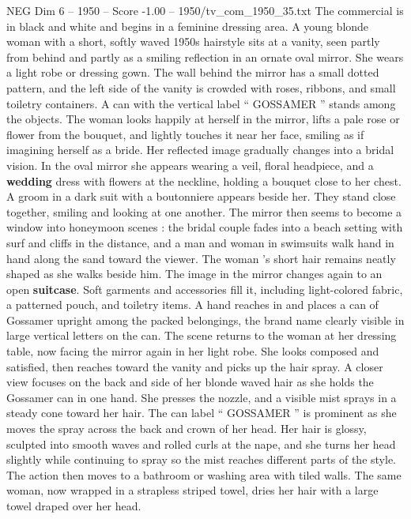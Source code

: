 \begin{textsample}{NEG Dim 6 – 1950 – Score -1.00 – 1950/tv\_com\_1950\_35.txt}  \label{ex:f6_neg_082}
The commercial is in black and white and begins in a feminine dressing area.
A young blonde woman with a short, softly waved 1950s hairstyle sits at a vanity, seen partly from behind and partly as a smiling reflection in an ornate oval mirror.
She wears a light robe or dressing gown.
The wall behind the mirror has a small dotted pattern, and the left side of the vanity is crowded with roses, ribbons, and small toiletry containers.
A can with the vertical label “ GOSSAMER ” stands among the objects.
The woman looks happily at herself in the mirror, lifts a pale rose or flower from the bouquet, and lightly touches it near her face, smiling as if imagining herself as a bride.
Her reflected image gradually changes into a bridal vision.
In the oval mirror she appears wearing a veil, floral headpiece, and a \textbf{wedding} dress with flowers at the neckline, holding a bouquet close to her chest.
A groom in a dark suit with a boutonniere appears beside her.
They stand close together, smiling and looking at one another.
The mirror then seems to become a window into honeymoon scenes : the bridal couple fades into a beach setting with surf and cliffs in the distance, and a man and woman in swimsuits walk hand in hand along the sand toward the viewer.
The woman ’s short hair remains neatly shaped as she walks beside him.
The image in the mirror changes again to an open \textbf{suitcase}.
Soft garments and accessories fill it, including light-colored fabric, a patterned pouch, and toiletry items.
A hand reaches in and places a can of Gossamer upright among the packed belongings, the brand name clearly visible in large vertical letters on the can.
The scene returns to the woman at her dressing table, now facing the mirror again in her light robe.
She looks composed and satisfied, then reaches toward the vanity and picks up the hair spray.
A closer view focuses on the back and side of her blonde waved hair as she holds the Gossamer can in one hand.
She presses the nozzle, and a visible mist sprays in a steady cone toward her hair.
The can label “ GOSSAMER ” is prominent as she moves the spray across the back and crown of her head.
Her hair is glossy, sculpted into smooth waves and rolled curls at the nape, and she turns her head slightly while continuing to spray so the mist reaches different parts of the style.
The action then moves to a bathroom or washing area with tiled walls.
The same woman, now wrapped in a strapless striped towel, dries her hair with a large towel draped over her head.

\end{textsample}
